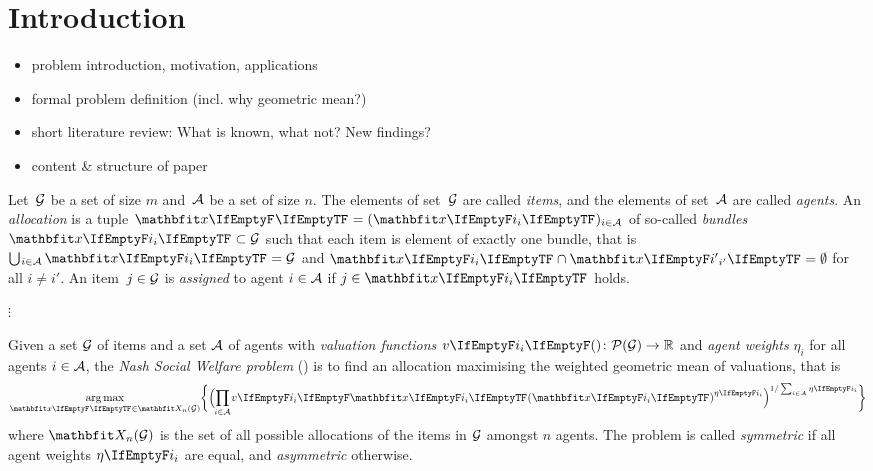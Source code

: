 \section{Introduction}
\label{sec:intro}

\begin{itemize}
	\item
	problem introduction, motivation, applications

	\item
	formal problem definition (incl. why geometric mean?)

	\item
	short literature review: What is known, what not? New findings?

	\item
	content \& structure of paper
\end{itemize}

\begin{definition}
	Let~\(\mathcal{G}\) be a set of size \(m\) and~\(\mathcal{A}\) be a set of size \(n\).
	The elements of set~\(\mathcal{G}\) are called \emph{items}, and the elements of set~\(\mathcal{A}\) are called \emph{agents}.
	An \emph{allocation} is a tuple \(\alloc[][] = (\alloc)_{i \in \agents}\) of so-called \emph{bundles} \(\alloc \subset \goods\) such that each item is element of exactly one bundle, that is \(\mathop{\bigcup\hspace{-1pt}_{i \in \agents}} \alloc = \goods\) and \(\alloc \cap \alloc[][i'] = \emptyset\) for all \(i \neq i'\).
	An item~\(j \in \mathcal{G}\) is \emph{assigned} to agent \(i \in \mathcal{A}\) if \(j \in \alloc\) holds.
\end{definition}

\(\vdots\)

\begin{problem}
	Given a set \(\mathcal{G}\) of items and a set \(\mathcal{A}\) of agents with \emph{valuation functions} \(\valuations \colon \powerset[\goods] \to \real\) and \emph{agent weights} \(\eta_i\) for all agents \(i \in \mathcal{A}\), the \emph{Nash Social Welfare problem} (\NSW) is to find an allocation maximising the weighted geometric mean of valuations, that is
	\begin{equation*}
		\argmax_{\alloc[][] \in \allallocs{n}{\goods}} \braces[\bigg]{ \paren[\Big]{ \smashoperator{\prod_{i \in \agents}} \valuations[\alloc]^{\weight} }^{1 / \sum_{i \in \agents} \weight} }
	\end{equation*}
	where \(\allallocs{n}{\goods}\) is the set of all possible allocations of the items in \(\mathcal{G}\) amongst \(n\) agents.
	The problem is called \emph{symmetric} if all agent weights \(\weight\) are equal, and \emph{asymmetric} otherwise.
\end{problem}


